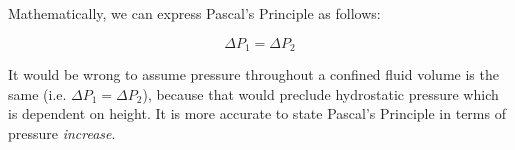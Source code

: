 Mathematically, we can express Pascal's Principle as follows:

$$\Delta P_1 = \Delta P_2$$

It would be wrong to assume pressure throughout a confined fluid volume is the same (i.e. $\Delta P_1 = \Delta P_2$), because that would preclude hydrostatic pressure which is dependent on height.  It is more accurate to state Pascal's Principle in terms of pressure {\it increase}.











